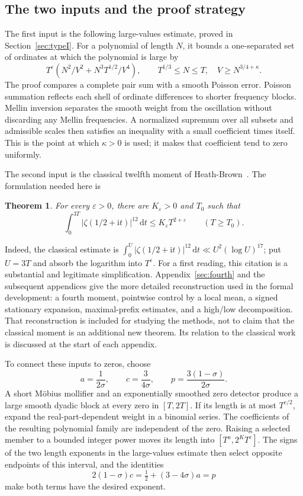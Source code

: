 \documentclass[11pt,a4paper]{article}
\numberwithin{equation}{section}
\newtheorem{theorem}{Theorem}[section]
\theoremstyle{definition}
\newcommand{\dd}{\,\mathrm d}
\newcommand{\ii}{\mathrm i}
\begin{document}
\subsection{The two inputs and the proof strategy}
The first input is the following large-values estimate, proved in
Section~\ref{sec:typeI}. For a polynomial of length $N$, it bounds a
one-separated set of ordinates at which the polynomial is large by
\[
 T^\varepsilon\left(N^2/V^2+N^3T^{1/2}/V^4\right),
 \qquad T^{1/3}\le N\le T,\quad V\ge N^{3/4+\kappa}.
\]
The proof compares a complete pair sum with a smooth Poisson error.
Poisson summation reflects each shell of ordinate differences to shorter
frequency blocks. Mellin inversion separates the smooth weight from the
oscillation without discarding any Mellin frequencies. A normalized
supremum over all subsets and admissible scales then satisfies an inequality
with a small coefficient times itself. This is the point at which
$\kappa>0$ is used; it makes that coefficient tend to zero uniformly.

The second input is the classical twelfth moment of
Heath-Brown~\cite[Theorem 1]{hb78}. The formulation needed here is
\begin{theorem}\label{thm:moment}
For every $\varepsilon>0$, there are $K_\varepsilon>0$ and $T_0$ such that
\[
 \int_0^{3T}|\zeta(1/2+\ii t)|^{12}\dd t
     \le K_\varepsilon T^{2+\varepsilon}\qquad(T\ge T_0).
\]
\end{theorem}
Indeed, the classical estimate is
$\int_0^U|\zeta(1/2+\ii t)|^{12}\dd t\ll U^2(\log U)^{17}$;
put $U=3T$ and absorb the logarithm into $T^\varepsilon$.
For a first reading, this citation is a substantial and legitimate
simplification. Appendix~\ref{sec:fourth} and the subsequent appendices give
the more detailed reconstruction used in the formal development: a fourth
moment, pointwise control by a local mean, a signed stationary expansion,
maximal-prefix estimates, and a high/low decomposition. That reconstruction
is included for studying the methods, not to claim that the classical moment
is an additional new theorem. Its relation to the classical work is discussed
at the start of each appendix.

To connect these inputs to zeros, choose
\[
 a=\frac1{2\sigma},\qquad c=\frac3{4\sigma},\qquad
 p=\frac{3(1-\sigma)}{2\sigma}.
\]
A short M\"obius mollifier and an exponentially smoothed zero detector
produce a large smooth dyadic block at every zero in $[T,2T]$.
If its length is at most $T^{c/2}$, expand the real-part-dependent weight in
a binomial series. The coefficients of the resulting polynomial family
are independent of the zero. Raising a selected member to a bounded
integer power moves its length into $[T^a,2^KT^c]$.
The signs of the two length exponents in the large-values estimate then
select opposite endpoints of this interval, and the identities
\[
 2(1-\sigma)c=\tfrac12+(3-4\sigma)a=p
\]
make both terms have the desired exponent.
\end{document}
